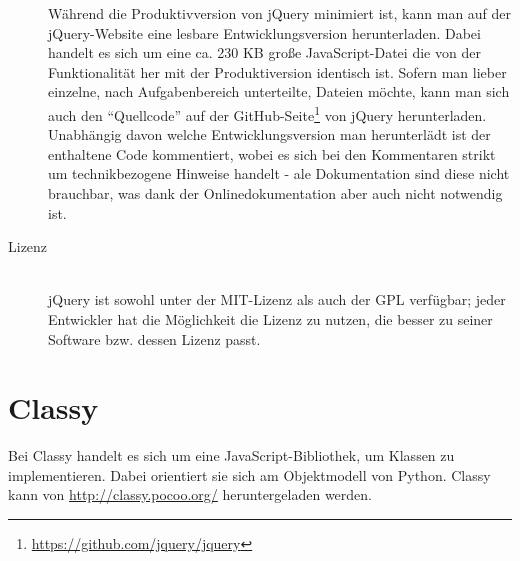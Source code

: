 \begin{description}
Während die Produktivversion von jQuery minimiert ist, kann man auf der jQuery-Website eine lesbare
Entwicklungsversion herunterladen. Dabei handelt es sich um eine ca. 230 KB große JavaScript-Datei
die von der Funktionalität her mit der Produktiversion identisch ist. Sofern man lieber einzelne,
nach Aufgabenbereich unterteilte, Dateien möchte, kann man sich auch den \enquote{Quellcode} auf der
GitHub-Seite\footnote{\href{https://github.com/jquery/jquery}{https://github.com/jquery/jquery}} von
jQuery herunterladen. Unabhängig davon welche Entwicklungsversion man herunterlädt ist der
enthaltene Code kommentiert, wobei es sich bei den Kommentaren strikt um technikbezogene Hinweise
handelt - ale Dokumentation sind diese nicht brauchbar, was dank der Onlinedokumentation aber auch
nicht notwendig ist.

\item[Lizenz] \hfill \\
jQuery ist sowohl unter der MIT-Lizenz als auch der GPL verfügbar; jeder Entwickler hat die
Möglichkeit die Lizenz zu nutzen, die besser zu seiner Software bzw. dessen Lizenz passt.
\end{description}






\section{Classy}
Bei Classy handelt es sich um eine JavaScript-Bibliothek, um Klassen zu implementieren. Dabei
orientiert sie sich am Objektmodell von Python. Classy kann von
\href{http://classy.pocoo.org/}{http://classy.pocoo.org/} heruntergeladen werden.


